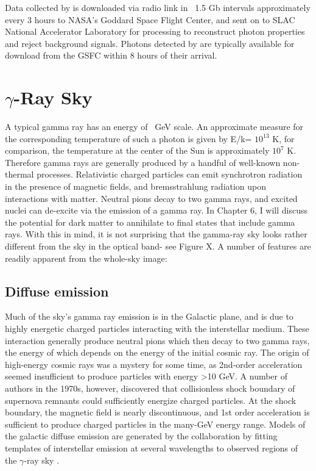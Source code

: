 Data collected by \FermiLAT is downloaded via radio link in ~1.5 Gb intervals approximately every 3 hours to NASA's Goddard Space Flight Center, and sent on to SLAC National Accelerator Laboratory for processing to reconstruct photon properties and reject background signals. Photons detected by \FermiLAT are typically available for download from the GSFC within 8 hours of their arrival.

\section{$\gamma$-Ray Sky}
A typical \FermiLAT gamma ray has an energy of ~GeV scale. An approximate measure for the corresponding temperature of such a photon is given by E/k= $10^13$ K, for comparison, the temperature at the center of the Sun is approximately $10^7$ K. Therefore gamma rays are generally produced by a handful of well-known non-thermal processes. Relativistic charged particles can emit synchrotron radiation in the presence of magnetic fields, and bremsstrahlung radiation upon interactions with matter. Neutral pions decay to two gamma rays, and excited nuclei can de-excite via the emission of a gamma ray. In Chapter 6, I will discuss the potential for dark matter to annihilate to final states that include gamma rays.
With this in mind, it is not surprising that the gamma-ray sky looks rather different from the sky in the optical band- see Figure X. A number of features are readily apparent from the whole-sky image:
\subsection{Diffuse emission}
Much of the sky's gamma ray emission is in the Galactic plane, and is due to highly energetic charged particles interacting with the interstellar medium. These interaction generally produce neutral pions which then decay to two gamma rays, the energy of which depends on the energy of the initial cosmic ray. 
The origin of high-energy cosmic rays was a mystery for some time, as 2nd-order \Fermi acceleration seemed insufficient to produce particles with energy >10 GeV. A number of authors in the 1970s, however, discovered that collisionless shock boundary of supernova remnants could sufficiently energize charged particles. At the shock boundary, the magnetic field is nearly discontinuous, and 1st order \Fermi acceleration is sufficient to produce charged particles in the many-GeV energy range.
Models of the galactic diffuse emission are generated by the \FermiLAT collaboration by fitting templates of interstellar emission at several wavelengths to observed regions of the $\gamma$-ray sky \cite{acero_development_2016}.
 
